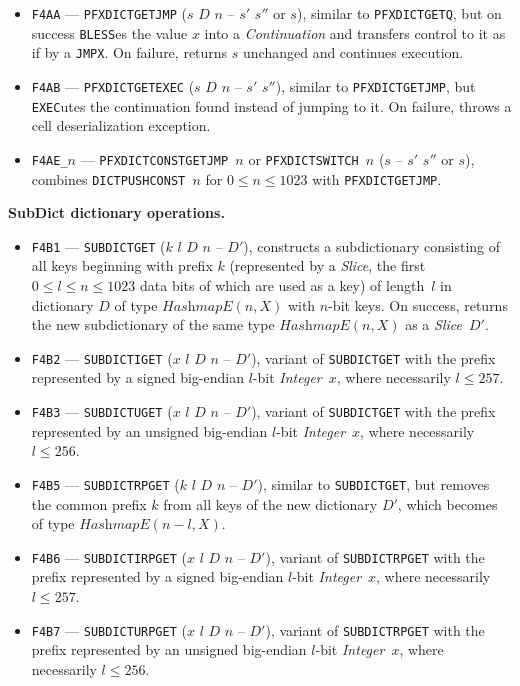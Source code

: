\documentclass[12pt,oneside]{article}
\def\makepoint#1{\medbreak\noindent{\bf #1.\ }}
\def\nxsubpoint{\refstepcounter{subsubsection}%
  \smallbreak\makepoint{\thesubsubsection}}
\def\emb#1{\textbf{#1.}}
\let\tp=\textit
\def\HashmapE{\tp{HashmapE}}
\begin{document}
\begin{itemize}
\item {\tt F4AA} --- {\tt PFXDICTGETJMP} ($s$ $D$ $n$ -- $s'$ $s''$ or $s$), similar to {\tt PFXDICTGETQ}, but on success {\tt BLESS}es the value $x$ into a {\em Continuation\/} and transfers control to it as if by a {\tt JMPX}. On failure, returns $s$ unchanged and continues execution.
\item {\tt F4AB} --- {\tt PFXDICTGETEXEC} ($s$ $D$ $n$ -- $s'$ $s''$), similar to {\tt PFXDICTGETJMP}, but {\tt EXEC}utes the continuation found instead of jumping to it. On failure, throws a cell deserialization exception.
\item {\tt F4AE\_$n$} --- {\tt PFXDICTCONSTGETJMP $n$} or {\tt PFXDICTSWITCH $n$} ($s$ -- $s'$ $s''$ or $s$), combines {\tt DICTPUSHCONST $n$} for $0\leq n\leq 1023$ with {\tt PFXDICTGETJMP}.
\end{itemize}

\nxsubpoint\label{sp:prim.dict.get}\emb{{\sc SubDict} dictionary operations}
\begin{itemize}
\item {\tt F4B1} --- {\tt SUBDICTGET} ($k$ $l$ $D$ $n$ -- $D'$), constructs a subdictionary consisting of all keys beginning with prefix $k$ (represented by a {\em Slice}, the first $0\leq l\leq n\leq 1023$ data bits of which are used as a key) of length~$l$ in dictionary $D$ of type $\HashmapE(n,X)$ with $n$-bit keys. On success, returns the new subdictionary of the same type $\HashmapE(n,X)$ as a {\em Slice}~$D'$.
\item {\tt F4B2} --- {\tt SUBDICTIGET} ($x$ $l$ $D$ $n$ -- $D'$), variant of {\tt SUBDICTGET} with the prefix represented by a signed big-endian $l$-bit {\em Integer\/}~$x$, where necessarily $l\leq257$.
\item {\tt F4B3} --- {\tt SUBDICTUGET} ($x$ $l$ $D$ $n$ -- $D'$), variant of {\tt SUBDICTGET} with the prefix represented by an unsigned big-endian $l$-bit {\em Integer\/}~$x$, where necessarily $l\leq256$.
\item {\tt F4B5} --- {\tt SUBDICTRPGET} ($k$ $l$ $D$ $n$ -- $D'$), similar to {\tt SUBDICTGET}, but removes the common prefix $k$ from all keys of the new dictionary $D'$, which becomes of type $\HashmapE(n-l,X)$.
\item {\tt F4B6} --- {\tt SUBDICTIRPGET} ($x$ $l$ $D$ $n$ -- $D'$), variant of {\tt SUBDICTRPGET} with the prefix represented by a signed big-endian $l$-bit {\em Integer\/}~$x$, where necessarily $l\leq257$.
\item {\tt F4B7} --- {\tt SUBDICTURPGET} ($x$ $l$ $D$ $n$ -- $D'$), variant of {\tt SUBDICTRPGET} with the prefix represented by an unsigned big-endian $l$-bit {\em Integer\/}~$x$, where necessarily $l\leq256$.
\end{itemize}
\end{document}
